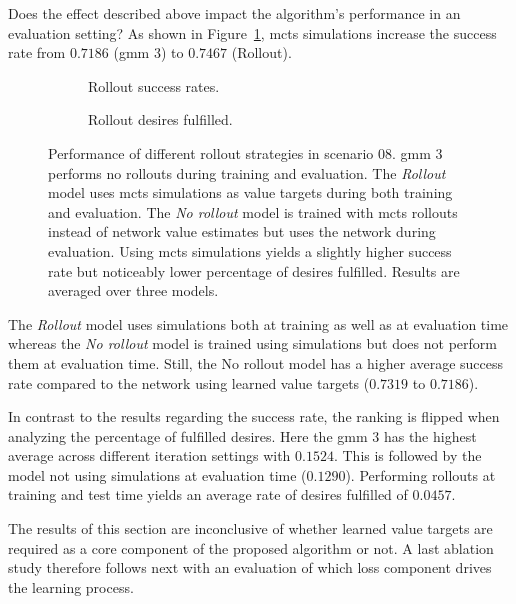 Does the effect described above impact the algorithm's performance in an evaluation setting? As shown in Figure~\ref{fig:rollout_success_matrix}, \gls{mcts} simulations increase the success rate from $0.7186$ (\gls{gmm} 3) to $0.7467$ (Rollout).
\begin{figure}
\begin{subfigure}{.5\textwidth}
  \centering
  \scalebox{0.5}{
  
  }
  \caption{Rollout success rates.}
  \label{fig:rollout_success_matrix}
\end{subfigure}
\begin{subfigure}{.5\textwidth}
  \centering
  \scalebox{0.5}{
  
  }
  \caption{Rollout desires fulfilled.}
  \label{fig:rollout_desire_matrix}
\end{subfigure}
\caption[Evaluation of different rollout strategies]{Performance of different rollout strategies in scenario 08. \gls{gmm} $3$ performs no rollouts during training and evaluation. The \emph{Rollout} model uses \gls{mcts} simulations as value targets during both training and evaluation. The \emph{No rollout} model is trained with \gls{mcts} rollouts instead of network value estimates but uses the network during evaluation. Using \gls{mcts} simulations yields a slightly higher success rate but noticeably lower percentage of desires fulfilled. Results are averaged over three models.}
\label{fig:rollout_matrix_plots}
\end{figure}
The \emph{Rollout} model uses simulations both at training as well as at evaluation time whereas the \emph{No rollout} model is trained using simulations but does not perform them at evaluation time. Still, the No rollout model has a higher average success rate compared to the network using learned value targets ($0.7319$ to $0.7186$).

In contrast to the results regarding the success rate, the ranking is flipped when analyzing the percentage of fulfilled desires. Here the \gls{gmm} $3$ has the highest average across different iteration settings with $0.1524$. This is followed by the model not using simulations at evaluation time ($0.1290$). Performing rollouts at training and test time yields an average rate of desires fulfilled of $0.0457$.

The results of this section are inconclusive of whether learned value targets are required as a core component of the proposed algorithm or not. A last ablation study therefore follows next with an evaluation of which loss component drives the learning process.

